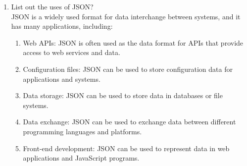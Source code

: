 \documentclass[11pt]{article}
\begin{document}
\begin{enumerate}
    \item List out the uses of JSON?\\

          JSON is a widely used format for data interchange between systems, and it has many applications, including:
          \begin{enumerate}
              \item Web APIs: JSON is often used as the data format for APIs that provide access to web services and data.
              \item Configuration files: JSON can be used to store configuration data for applications and systems.
              \item Data storage: JSON can be used to store data in databases or file systems.
              \item Data exchange: JSON can be used to exchange data between different programming languages and platforms.
              \item Front-end development: JSON can be used to represent data in web applications and JavaScript programs.
          \end{enumerate}
\end{enumerate}
\end{document}
